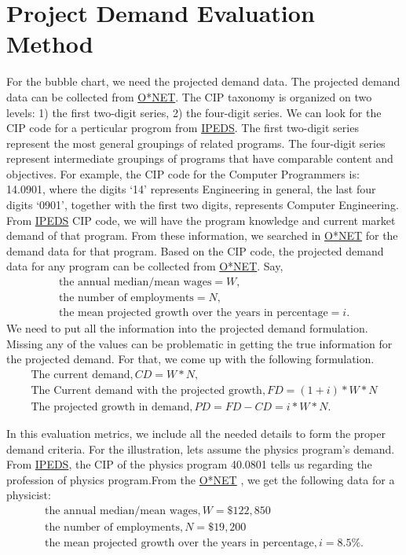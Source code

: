 \documentclass{article}
\begin{document}
\maketitle
\section{Project Demand Evaluation Method}
For the bubble chart, we need the projected demand data. The projected demand data can be collected from \href{https://www.onetonline.org/}{O*NET}. The CIP taxonomy is organized on two levels: 1) the first two-digit series, 2) the four-digit series. We can look for the CIP code for a perticular progrom from \href{https://nces.ed.gov/ipeds/cipcode/default.aspx?y=55}{IPEDS}. The first two-digit series represent the most general groupings of related programs. The four-digit series represent intermediate groupings of programs that have comparable content and objectives. For example, the CIP code for the Computer Programmers is: 14.0901, where the digits ‘14’ represents Engineering in general, the last four digits ‘0901', together with the first two digits, represents Computer Engineering. From \href{https://nces.ed.gov/ipeds/cipcode/default.aspx?y=55}{IPEDS} CIP code, we will have the program knowledge and current market demand of that program. From these information, we searched in \href{https://www.onetonline.org/}{O*NET} for the demand data for that program. Based on the CIP code, the projected demand data for any program can be collected from \href{https://www.onetonline.org/}{O*NET}. Say,
\begin{align*}
\text{the annual median/mean wages}= W,\\
\text{the number of employments}=N,\\
\text{the mean projected growth over the years in percentage} = i.
\end{align*}
We need to put all the information into the projected demand formulation. Missing any of the values can be problematic in getting the true information for the projected demand. For that, we come up with the following formulation.
\begin{align*}
\text{The current demand}, CD=W*N,\\
\text{The Current demand with the projected growth},  FD=(1+i)*W*N\\
\text{The projected growth in demand}, PD=FD-CD=i*W*N.  
\end{align*}

In this evaluation metrics, we include all the needed details to form the proper demand criteria. 
For the illustration, lets assume the physics program’s demand. From \href{https://nces.ed.gov/ipeds/cipcode/default.aspx?y=55}{IPEDS}, the CIP of the physics program 40.0801 tells us regarding the profession of physics program.From the \href{https://www.onetonline.org/}{O*NET} , we get the following data for a physicist:
\begin{align*}
\text{the annual median/mean wages}, W=\$122,850
\\
\text{the number of employments},N=\$19,200\\
\text{the mean projected growth over the years in percentage},i =8.5\%.
\end{align*}
\end{document}
